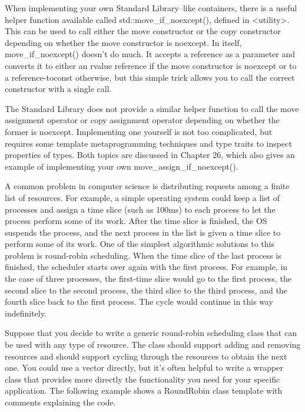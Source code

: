 When implementing your own Standard Library–like containers, there is a useful helper function available called std::move\_if\_noexcept(), defined in <utility>. This can be used to call either the move constructor or the copy constructor depending on whether the move constructor is noexcept. In itself, move\_if\_noexcept() doesn’t do much. It accepts a reference as a parameter and converts it to either an rvalue reference if the move constructor is noexcept or to a reference-toconst otherwise, but this simple trick allows you to call the correct constructor with a single call.

The Standard Library does not provide a similar helper function to call the move assignment operator or copy assignment operator depending on whether the former is noexcept. Implementing one yourself is not too complicated, but requires some template metaprogramming techniques and type traits to inspect properties of types. Both topics are discussed in Chapter 26, which also gives an example of implementing your own move\_assign\_if\_noexcept().


A common problem in computer science is distributing requests among a finite list of resources. For example, a simple operating system could keep a list of processes and assign a time slice (such as 100ms) to each process to let the process perform some of its work. After the time slice is finished, the OS suspends the process, and the next process in the list is given a time slice to perform some of its work. One of the simplest algorithmic solutions to this problem is round-robin scheduling. When the time slice of the last process is finished, the scheduler starts over again with the first process. For example, in the case of three processes, the first-time slice would go to the first process, the second slice to the second process, the third slice to the third process, and the fourth slice back to the first process. The cycle would continue in this way indefinitely.

Suppose that you decide to write a generic round-robin scheduling class that can be used with any type of resource. The class should support adding and removing resources and should support cycling through the resources to obtain the next one. You could use a vector directly, but it’s often helpful to write a wrapper class that provides more directly the functionality you need for your specific application. The following example shows a RoundRobin class template with comments explaining the code.

